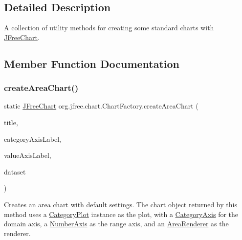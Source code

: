 \subsection{Detailed Description}
A collection of utility methods for creating some standard charts with \mbox{\hyperlink{classorg_1_1jfree_1_1chart_1_1_j_free_chart}{J\+Free\+Chart}}. 

\subsection{Member Function Documentation}
\mbox{\label{classorg_1_1jfree_1_1chart_1_1_chart_factory_a80b7f6fcbe8a9a2b2f84da2a692e2e9f}} 
\subsubsection{\texorpdfstring{create\+Area\+Chart()}{createAreaChart()}\hspace{0.1cm}{\footnotesize\ttfamily [1/2]}}
{\footnotesize\ttfamily static \mbox{\hyperlink{classorg_1_1jfree_1_1chart_1_1_j_free_chart}{J\+Free\+Chart}} org.\+jfree.\+chart.\+Chart\+Factory.\+create\+Area\+Chart (\begin{DoxyParamCaption}\item[{String}]{title,  }\item[{String}]{category\+Axis\+Label,  }\item[{String}]{value\+Axis\+Label,  }\item[{\mbox{\hyperlink{interfaceorg_1_1jfree_1_1data_1_1category_1_1_category_dataset}{Category\+Dataset}}}]{dataset }\end{DoxyParamCaption})\hspace{0.3cm}{\ttfamily [static]}}

Creates an area chart with default settings. The chart object returned by this method uses a \mbox{\hyperlink{}{Category\+Plot}} instance as the plot, with a \mbox{\hyperlink{}{Category\+Axis}} for the domain axis, a \mbox{\hyperlink{}{Number\+Axis}} as the range axis, and an \mbox{\hyperlink{}{Area\+Renderer}} as the renderer.


